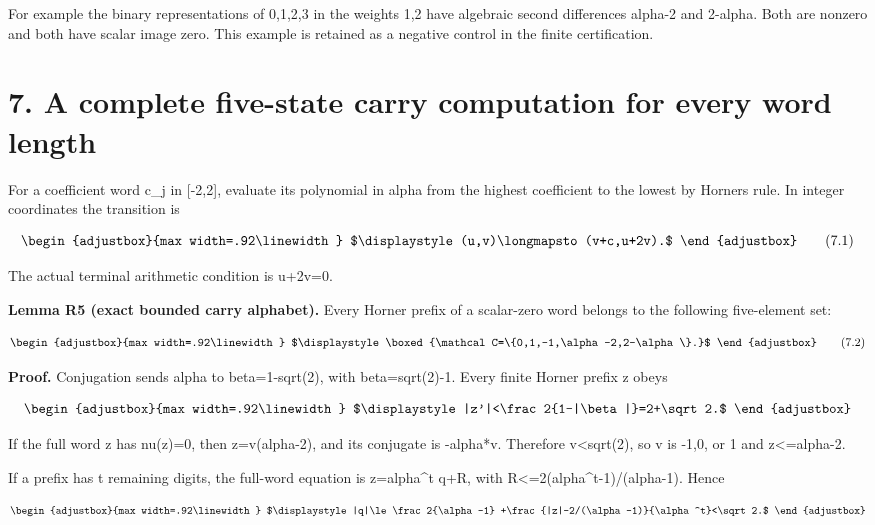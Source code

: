 For example the binary representations of 0,1,2,3 in the weights 1,2 have algebraic second differences alpha-2 and 2-alpha. Both are nonzero and both have scalar image zero. This example is retained as a negative control in the finite certification.

\section{7. A complete five-state carry computation for every word length}\label{n14-a-complete-five-state-carry-computation-for-every-word-length}

For a coefficient word c\_j in {[}-2,2{]}, evaluate its polynomial in alpha from the highest coefficient to the lowest by Horner\textquotesingle s rule. In integer coordinates the transition is

\[
\begin{adjustbox}{max width=.92\linewidth}
$\displaystyle (u,v)\longmapsto(v+c,u+2v).$
\end{adjustbox}
\tag{7.1}
\]

The actual terminal arithmetic condition is u+2v=0.

\textbf{Lemma R5 (exact bounded carry alphabet).} Every Horner prefix of a scalar-zero word belongs to the following five-element set:

\[
\begin{adjustbox}{max width=.92\linewidth}
$\displaystyle \boxed{\mathcal C=\{0,1,-1,\alpha-2,2-\alpha\}.}$
\end{adjustbox}
\tag{7.2}
\]

\textbf{Proof.} Conjugation sends alpha to beta=1-sqrt(2), with \textbar beta\textbar=sqrt(2)-1. Every finite Horner prefix z obeys

\[
\begin{adjustbox}{max width=.92\linewidth}
$\displaystyle |z'|<\frac2{1-|\beta|}=2+\sqrt2.$
\end{adjustbox}
\]

If the full word z has nu(z)=0, then z=v(alpha-2), and its conjugate is -alpha*v. Therefore \textbar v\textbar\textless sqrt(2), so v is -1,0, or 1 and \textbar z\textbar\textless=alpha-2.

If a prefix has t remaining digits, the full-word equation is z=alpha\^{}t q+R, with \textbar R\textbar\textless=2(alpha\^{}t-1)/(alpha-1). Hence

\[
\begin{adjustbox}{max width=.92\linewidth}
$\displaystyle |q|\le\frac2{\alpha-1}
 +\frac{|z|-2/(\alpha-1)}{\alpha^t}<\sqrt2.$
\end{adjustbox}
\]

